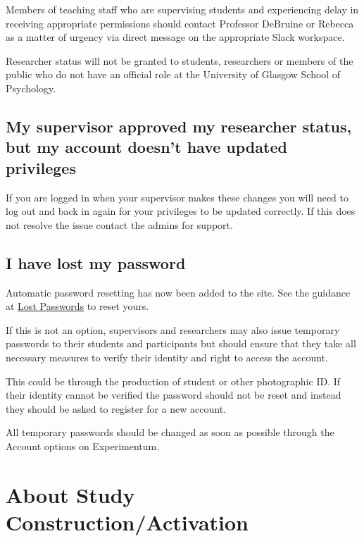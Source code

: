 \documentclass[]{book}
\begin{document}
Members of teaching staff who are supervising students and experiencing
delay in receiving appropriate permissions should contact Professor
DeBruine or Rebecca as a matter of urgency via direct message on the
appropriate Slack workspace.

Researcher status will not be granted to students, researchers or
members of the public who do not have an official role at the University
of Glasgow School of Psychology.

\subsection*{My supervisor approved my researcher status, but my account
doesn't have updated
privileges}\label{my-supervisor-approved-my-researcher-status-but-my-account-doesnt-have-updated-privileges}

If you are logged in when your supervisor makes these changes you will
need to log out and back in again for your privileges to be updated
correctly. If this does not resolve the issue contact the admins for
support.

\subsection*{I have lost my password}\label{i-have-lost-my-password}

Automatic password resetting has now been added to the site. See the
guidance at \protect\hyperlink{lost_password}{Lost Passwords} to reset
yours.

If this is not an option, supervisors and researchers may also issue
temporary passwords to their students and participants but should ensure
that they take all necessary measures to verify their identity and right
to access the account.

This could be through the production of student or other photographic
ID. If their identity cannot be verified the password should not be
reset and instead they should be asked to register for a new account.

All temporary passwords should be changed as soon as possible through
the Account options on Experimentum.

\section*{About Study
Construction/Activation}\label{about-study-constructionactivation}
\end{document}
